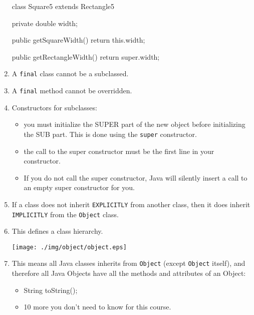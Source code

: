 \documentclass[a4paper, 9pt]{extarticle}
\begin{document}
\begin{enumerate}
\begin{blackboard}
class Square5 extends Rectangle5 {
  private double width;

  public getSquareWidth() {
    return this.width;
  }

  public getRectangleWidth() {
    return super.width;
  }
}
\end{blackboard}

  \item A \verb+final+ class cannot be a subclassed.

  \item A \verb+final+ method cannot be overridden.

  \item Constructors for subclasses:

    \begin{itemize}

      \item you must initialize the SUPER part of the new object before
        initializing the SUB part. This is done using the \verb+super+
        constructor.

      \item the call to the super constructor must be the first line in your
        constructor.

      \item If you do not call the super constructor, Java will silently insert
        a call to an empty super constructor for you.

    \end{itemize}

  \item If a class does not inherit \verb+EXPLICITLY+ from another class, then
    it does inherit \verb+IMPLICITLY+ from the \verb+Object+ class.

  \item This defines a class hierarchy.

    \begin{center}
      \texttt{[image: ./img/object/object.eps]}
    \end{center}

  \item This means all Java classes inherits from \verb+Object+ (except
    \verb+Object+ itself), and therefore all Java Objects have all the methods and
    attributes of an Object:

      \begin{itemize}

        \item String toString();

        \item 10 more you don't need to know for this course.

      \end{itemize}

\end{enumerate}
\end{document}
